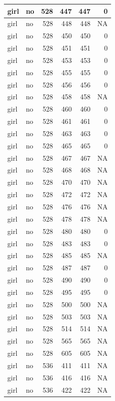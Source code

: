 \documentclass[man]{apa6}
\begin{document}
\begin{tabular}{l|l|r|r|r|r}
\hline
girl & no & 528 & 447 & 447 & 0\\
\hline
girl & no & 528 & 448 & 448 & NA\\
\hline
girl & no & 528 & 450 & 450 & 0\\
\hline
girl & no & 528 & 451 & 451 & 0\\
\hline
girl & no & 528 & 453 & 453 & 0\\
\hline
girl & no & 528 & 455 & 455 & 0\\
\hline
girl & no & 528 & 456 & 456 & 0\\
\hline
girl & no & 528 & 458 & 458 & NA\\
\hline
girl & no & 528 & 460 & 460 & 0\\
\hline
girl & no & 528 & 461 & 461 & 0\\
\hline
girl & no & 528 & 463 & 463 & 0\\
\hline
girl & no & 528 & 465 & 465 & 0\\
\hline
girl & no & 528 & 467 & 467 & NA\\
\hline
girl & no & 528 & 468 & 468 & NA\\
\hline
girl & no & 528 & 470 & 470 & NA\\
\hline
girl & no & 528 & 472 & 472 & NA\\
\hline
girl & no & 528 & 476 & 476 & NA\\
\hline
girl & no & 528 & 478 & 478 & NA\\
\hline
girl & no & 528 & 480 & 480 & 0\\
\hline
girl & no & 528 & 483 & 483 & 0\\
\hline
girl & no & 528 & 485 & 485 & NA\\
\hline
girl & no & 528 & 487 & 487 & 0\\
\hline
girl & no & 528 & 490 & 490 & 0\\
\hline
girl & no & 528 & 495 & 495 & 0\\
\hline
girl & no & 528 & 500 & 500 & NA\\
\hline
girl & no & 528 & 503 & 503 & NA\\
\hline
girl & no & 528 & 514 & 514 & NA\\
\hline
girl & no & 528 & 565 & 565 & NA\\
\hline
girl & no & 528 & 605 & 605 & NA\\
\hline
girl & no & 536 & 411 & 411 & NA\\
\hline
girl & no & 536 & 416 & 416 & NA\\
\hline
girl & no & 536 & 422 & 422 & NA\\

\end{tabular}
\end{document}
